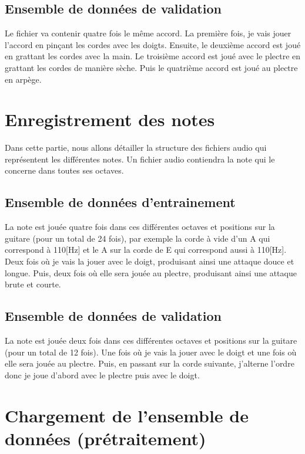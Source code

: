 \subsection{Ensemble de données de validation}
\label{sec:4.5}

Le fichier va contenir quatre fois le même accord. La première fois, je vais jouer l'accord en pinçant les cordes avec les doigts. Ensuite, le deuxième accord est joué en grattant les cordes avec la main. Le troisième accord est joué avec le plectre en grattant les cordes de manière sèche. Puis le quatrième accord est joué au plectre en arpège.

\section{Enregistrement des notes}
\label{sec:4.6}

Dans cette partie, nous allons détailler la structure des fichiers audio qui représentent les différentes notes. Un fichier audio contiendra la note qui le concerne dans toutes ses octaves.

\subsection{Ensemble de données d'entrainement}

La note est jouée quatre fois dans ces différentes octaves et positions sur la guitare (pour un total de 24 fois), par exemple la corde à vide d'un A qui correspond à 110[Hz] et le A sur la corde de E qui correspond aussi à 110[Hz]. Deux fois où je vais la jouer avec le doigt, produisant ainsi une attaque douce et longue. Puis, deux fois où elle sera jouée au plectre, produisant ainsi une attaque brute et courte. 

\subsection{Ensemble de données de validation}

La note est jouée deux fois dans ces différentes octaves et positions sur la guitare (pour un total de 12 fois). Une fois où je vais la jouer avec le doigt et une fois où elle sera jouée au plectre. Puis, en passant sur la corde suivante, j'alterne l'ordre donc je joue d'abord avec le plectre puis avec le doigt.

\section{Chargement de l'ensemble de données (prétraitement)}
\label{sec:4.7}

